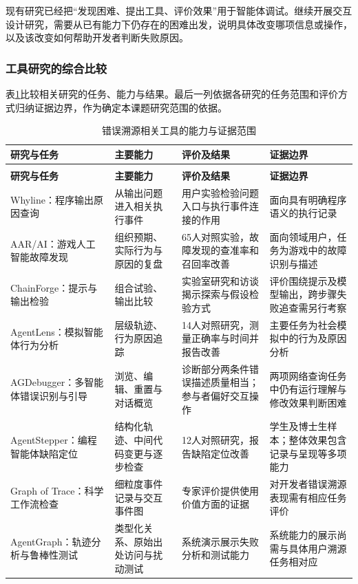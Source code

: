 现有研究已经把“发现困难、提出工具、评价效果”用于智能体调试。继续开展交互设计研究，需要从已有能力下仍存在的困难出发，说明具体改变哪项信息或操作，以及该改变如何帮助开发者判断失败原因。

\subsubsection{工具研究的综合比较}

表\ref{tab:literature-review-1}比较相关研究的任务、能力与结果。最后一列依据各研究的任务范围和评价方式归纳证据边界，作为确定本课题研究范围的依据。

\begingroup
\small
{}
\renewcommand{\arraystretch}{1.1}
\setlength{\LTleft}{0pt}
\setlength{\LTright}{0pt}
\begin{longtable}{@{}>{\raggedright\arraybackslash}p{0.23\dimexpr\textwidth-6\tabcolsep\relax}>{\raggedright\arraybackslash}p{0.24\dimexpr\textwidth-6\tabcolsep\relax}>{\raggedright\arraybackslash}p{0.27\dimexpr\textwidth-6\tabcolsep\relax}>{\raggedright\arraybackslash}p{0.26\dimexpr\textwidth-6\tabcolsep\relax}@{}}
\caption{错误溯源相关工具的能力与证据范围}\label{tab:literature-review-1}\\
\toprule
\textbf{研究与任务} & \textbf{主要能力} & \textbf{评价及结果} & \textbf{证据边界} \\
\midrule
\endfirsthead
\multicolumn{4}{c}{表\thetable\quad 错误溯源相关工具的能力与证据范围（续）}\\
\toprule
\textbf{研究与任务} & \textbf{主要能力} & \textbf{评价及结果} & \textbf{证据边界} \\
\midrule
\endhead
\bottomrule
\endfoot
Whyline\cite{ref07}：程序输出原因查询 & 从输出问题进入相关执行事件 & 用户实验检验问题入口与执行事件连接的作用 & 面向具有明确程序语义的执行记录 \\
AAR/AI\cite{ref04}：游戏人工智能故障发现 & 组织预期、实际行为与原因的复盘 & 65人对照实验，故障发现的查准率和召回率改善 & 面向领域用户，任务为游戏中的故障识别与描述 \\
ChainForge\cite{arawjo2024chainforge}：提示与输出检验 & 组合试验、输出比较 & 实验室研究和访谈揭示探索与假设检验方式 & 评价围绕提示及模型输出，跨步骤失败追查需另行考察 \\
AgentLens\cite{ref22}：模拟智能体行为分析 & 层级轨迹、行为原因追踪 & 14人对照研究，测量正确率与时间并报告改善 & 主要任务为社会模拟中的行为及原因分析 \\
AGDebugger\cite{ref02}：多智能体错误识别与引导 & 浏览、编辑、重置与对话概览 & 诊断部分两条件错误描述质量相当；参与者偏好交互操作 & 两项网络查询任务中仍有运行理解与修改效果判断困难 \\
AgentStepper\cite{ref18}：编程智能体缺陷定位 & 结构化轨迹、中间代码变更与逐步检查 & 12人对照研究，报告缺陷定位改善 & 学生及博士生样本；整体效果包含记录与呈现等多项能力 \\
Graph of Trace\cite{ref24}：科学工作流检查 & 细粒度事件记录与交互事件图 & 专家评价提供使用价值方面的证据 & 对开发者错误溯源表现需有相应任务评价 \\
AgentGraph\cite{ref23}：轨迹分析与鲁棒性测试 & 类型化关系、原始出处访问与扰动测试 & 系统演示展示失败分析和测试能力 & 系统能力的展示尚需与具体用户溯源任务相对应 \\
\end{longtable}
